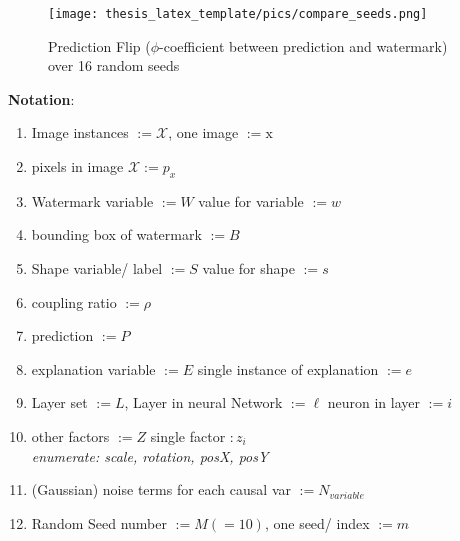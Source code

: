 \begin{figure}
    \centering
    \texttt{[image: thesis\_latex\_template/pics/compare\_seeds.png]}
    \caption[Comparing Seeds]{Prediction Flip ($\phi$-coefficient between prediction and watermark) over 16 random seeds}
    \label{fig:gt_over_seeds}
\end{figure}

{\color{codepurple} 
\textbf{Notation}:
\begin{enumerate}
    \item Image instances $:= \mathcal{X}$, one image $:= \mathrm{x}$
    \item pixels in image $\mathcal{X} := p_x$
    \item Watermark variable $:= W$ value for variable $:= w$
    \item bounding box of watermark $:= B$
    \item Shape variable/ label $:= S$ value for shape $:= s$
    \item coupling ratio $:= \rho$
    \item prediction $:= P$
    \item explanation variable $:= E$ single instance of explanation $:= e$
    \item Layer set $:= L$, Layer in neural Network $:= \ell$ neuron in layer $:= i$
    \item other factors $:= Z$ single factor $:z_i$ \\ 
    \textit{enumerate: scale, rotation, posX, posY}
    \item (Gaussian) noise terms for each causal var $:= N_{variable}$
    \item Random Seed number $:= M (=10)$, one seed/ index $:=m$
\end{enumerate}
}